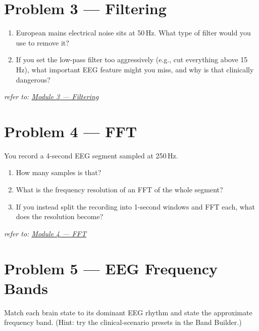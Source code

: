 \documentclass[11pt,letterpaper]{article}
\begin{document}
\vfill

\section*{Problem 3 — Filtering}
\begin{enumerate}[label=(\alph*),leftmargin=*]
\item European mains electrical noise sits at 50\,Hz. What type of filter would you use to remove it?
\item If you set the low-pass filter too aggressively (e.g., cut everything above 15\,Hz), what important EEG feature might you miss, and why is that clinically dangerous?
\end{enumerate}

\vspace{4cm}
\hfill\textit{\small refer to: \href{https://judepj.github.io/neuro-signals-101/modules/03_filtering.html}{Module 3 — Filtering}}

\vfill\pagebreak

\section*{Problem 4 — FFT}
You record a 4-second EEG segment sampled at 250\,Hz.
\begin{enumerate}[label=(\alph*),leftmargin=*]
\item How many samples is that?
\item What is the frequency resolution of an FFT of the whole segment?
\item If you instead split the recording into 1-second windows and FFT each, what does the resolution become?
\end{enumerate}

\vspace{4.5cm}
\hfill\textit{\small refer to: \href{https://judepj.github.io/neuro-signals-101/modules/04_fft.html}{Module 4 — FFT}}

\vfill

\section*{Problem 5 — EEG Frequency Bands}
Match each brain state to its dominant EEG rhythm and state the approximate
frequency band. (Hint: try the clinical-scenario presets in the Band Builder.)
\end{document}
